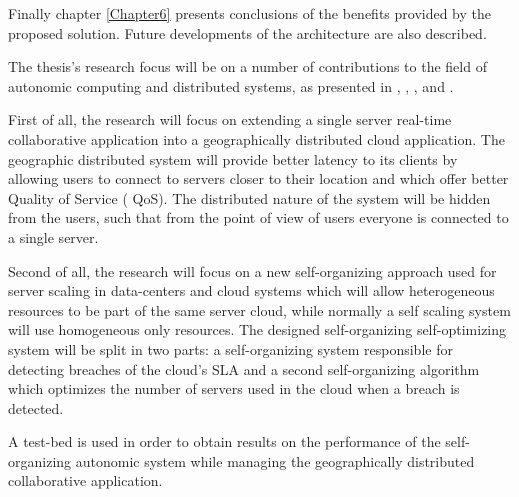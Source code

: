 Finally chapter \ref{Chapter6} presents conclusions of the benefits provided by the proposed solution. Future developments of the architecture are also described.

The thesis's research focus will be on a number of contributions to the field of autonomic computing and distributed systems, as presented in \cite{bogdan:lindi}, \cite{bogdan:amgcc2013}, \cite{bogdan:cts2012}, \cite{bogdan:conti2010} and \cite{bogdan:miles2012chapter}. 

First of all, the research will focus on extending a single server real-time collaborative application into a geographically distributed cloud application. The geographic distributed system will provide better latency to its clients by allowing users to connect to servers closer to their location and which offer better Quality of Service ( QoS). The distributed nature of the system will be hidden from the users, such that from the point of view of users everyone is connected to a single server.

Second of all, the research will focus on a new self-organizing approach used for server scaling in data-centers and cloud systems which will allow heterogeneous resources to be part of the same server cloud, while normally a self scaling system will use homogeneous only resources. The designed self-organizing self-optimizing system will be split in two parts: a self-organizing system responsible for detecting breaches of the cloud's SLA and a second self-organizing algorithm which optimizes the number of servers used in the cloud when a breach is detected.

A test-bed is used in order to obtain results on the performance of the self-organizing autonomic system while managing the geographically distributed collaborative application.